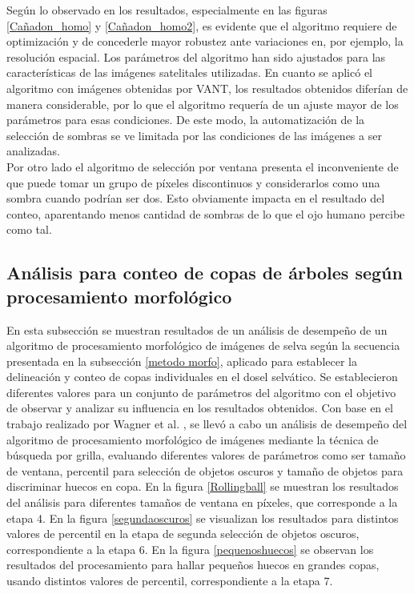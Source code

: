 Según lo observado en los resultados, especialmente en las figuras \ref{Cañadon_homo} y \ref{Cañadon_homo2}, es evidente que el algoritmo requiere de optimización y de concederle mayor robustez ante variaciones en, por ejemplo, la resolución espacial. Los parámetros del algoritmo han sido ajustados para las características de las imágenes satelitales utilizadas. En cuanto se aplicó el algoritmo con imágenes obtenidas por VANT, los resultados obtenidos diferían de manera considerable, por lo que el algoritmo requería de un ajuste mayor de los parámetros para esas condiciones. De este modo, la automatización de la selección de sombras se ve limitada por las condiciones de las imágenes a ser analizadas.\\
Por otro lado el algoritmo de selección por ventana presenta el inconveniente de que puede tomar un grupo de píxeles discontinuos y considerarlos como una sombra cuando podrían ser dos. Esto obviamente impacta en el resultado del conteo, aparentando menos cantidad de sombras de lo que el ojo humano percibe como tal.                                               
\subsection{Análisis para conteo de copas de árboles según procesamiento morfológico} \label{resultados morfologico}
En esta subsección se muestran resultados de un análisis de desempeño de un algoritmo de procesamiento morfológico de imágenes de selva según la secuencia presentada en la subsección \ref{metodo morfo}, aplicado para establecer la delineación y conteo de copas individuales en el dosel selvático. Se establecieron diferentes valores para un conjunto de parámetros del algoritmo con el objetivo de observar y analizar su influencia en los resultados obtenidos.
Con base en el trabajo realizado por Wagner et al. \cite{hubert_wagner_individual_2018}, se llevó a cabo un análisis de desempeño del algoritmo de procesamiento morfológico de imágenes mediante la técnica de búsqueda por grilla, evaluando diferentes valores de parámetros como ser tamaño de ventana, percentil para selección de objetos oscuros y tamaño de objetos para discriminar huecos en copa. En la figura \ref{Rollingball} se muestran los resultados del análisis para diferentes tamaños de ventana en  píxeles, que corresponde a la etapa 4. En la figura \ref{segundaoscuros} se visualizan los resultados para distintos valores de percentil en la etapa de segunda selección de objetos oscuros, correspondiente a la etapa 6. En la figura \ref{pequenoshuecos} se observan los resultados del procesamiento para hallar pequeños huecos en grandes copas, usando distintos valores de percentil, correspondiente a la etapa 7. 

